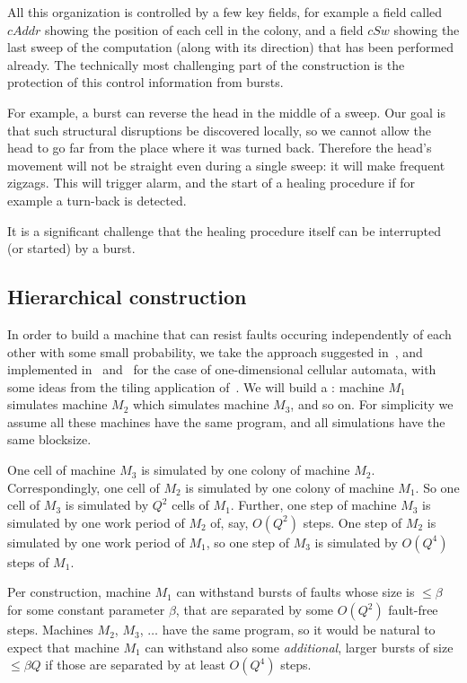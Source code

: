 \documentclass[12pt]{memoir}
\newcommand{\fld}[1]{\ensuremath{\textit{#1}}}
\newcommand{\cAddr}{\fld{cAddr}}
\newcommand{\cSweep}{\fld{cSw}}
\begin{document}
All this organization is controlled by a few key fields, for example a field
called \( \cAddr \) showing the position of each cell in the colony, and a field
\( \cSweep \) showing the last sweep of the computation (along with its direction)
that has been performed already.
The technically most challenging part of the construction is the protection of this
control information from bursts.

For example, a burst can reverse the head in the middle of a sweep.
Our goal is that such structural disruptions be discovered locally, so
we cannot allow the head to go far from the place where it was turned back.
Therefore the head's movement will not be straight even during a single
sweep: it will make frequent zigzags.
This will trigger alarm, and the start of a healing procedure if for example
a turn-back is detected.

It is a significant challenge that the healing procedure
itself can be interrupted (or started) by a burst.


\subsection{Hierarchical construction}

In order to build a machine that can resist faults 
occuring independently of each other with some small probability,
we take the approach suggested in~\cite{Kurd78},
and implemented in~\cite{Gacs1dim86} and~\cite{GacsSorg01}
for the case of one-dimensional cellular automata, with some ideas
from the tiling application of~\cite{DurandRomashShenTiling12}.
We will build a :
machine \( M_1 \) simulates machine \( M_2 \) which 
simulates machine \( M_3 \), and so on.
For simplicity we assume all these machines have the same program,
and all simulations have the same blocksize.

One cell of machine \( M_3 \) is simulated by one colony of machine \( M_2 \).
Correspondingly, one cell of \( M_2 \) is simulated by
one colony of machine \( M_1 \).
So one cell of \( M_3 \) is simulated by \( Q^2 \) cells of \( M_1 \).
Further, one step of machine \( M_3 \) is simulated by one
work period of \( M_2 \) of, say, \( O(Q^{2}) \) steps.
One step of \( M_2 \) is simulated by one work period of \( M_1 \),
so one step of \( M_3 \) is simulated by \( O(Q^{4}) \) steps of \( M_1 \).

Per construction, machine \( M_{1} \) can withstand
bursts of faults whose size is \( \le \beta \) for some constant parameter \( \beta \), that
are separated by some \( O(Q^{2}) \) fault-free steps.
Machines \( M_2 \), \( M_3 \), \( \dots \) have the same program, so it
would be natural to expect that machine
\( M_1 \) can withstand also some \emph{additional}, larger bursts
of size \( \le \beta Q \) if those are separated by at least \( O(Q^{4}) \) steps.
\end{document}
